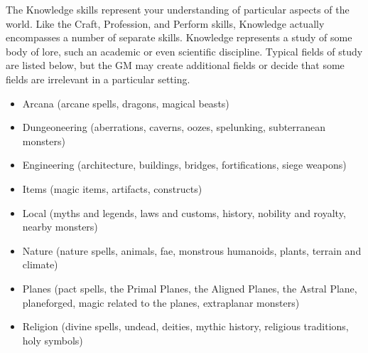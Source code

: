 \newpage
{}
    The Knowledge skills represent your understanding of particular aspects of the world.
    Like the Craft, Profession, and Perform skills, Knowledge actually encompasses a number of separate skills.
    Knowledge represents a study of some body of lore, such an academic or even scientific discipline.
    Typical fields of study are listed below, but the GM may create additional fields or decide that some fields are irrelevant in a particular setting.
        \begin{itemize}
            \item Arcana (arcane spells, dragons, magical beasts)
            \item Dungeoneering (aberrations, caverns, oozes, spelunking, subterranean monsters)
            \item Engineering (architecture, buildings, bridges, fortifications, siege weapons)
            \item Items (magic items, artifacts, constructs)
            \item Local (myths and legends, laws and customs, history, nobility and royalty, nearby monsters)
            \item Nature (nature spells, animals, fae, monstrous humanoids, plants, terrain and climate)
            \item Planes (pact spells, the Primal Planes, the Aligned Planes, the Astral Plane,
                planeforged, magic related to the planes, extraplanar monsters)
            \item Religion (divine spells, undead, deities, mythic history, religious traditions, holy symbols)
        \end{itemize}

